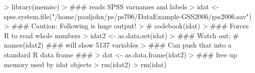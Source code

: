 \begin{Schunk}
\begin{Sinput}
> library(memisc)
> ### reads SPSS varnames and labels 
> idat <- spss.system.file("/home/pauljohn/ps/ps706/DataExample-GSS2006/gss2006.sav") 
> ### Caution: Following is huge output! 
> # codebook(idat)
> ### Forces R to read whole numbers 
> idat2 <- as.data.set(idat)
> ### Watch out: # names(idat2) ### will show 5137 variables
> ### Can push that into a standard R data frame ### 
> dat <- as.data.frame(idat2)
> ### free up memory used by idat objects 
> rm(idat2) 
> rm(idat)
\end{Sinput}
\end{Schunk}
